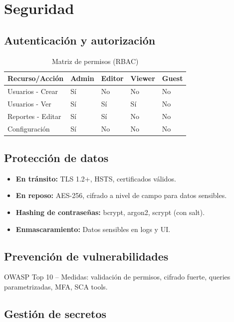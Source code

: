 \documentclass[a4paper,11pt,spanish]{article}
\begin{document}
\newpage

\section{Seguridad}

\subsection{Autenticación y autorización}

\begin{table}[H]
\centering
\caption{Matriz de permisos (RBAC)}
\label{tab:rbac}
\begin{tabular}{@{}lllll@{}}
\toprule
\textbf{Recurso/Acción} & \textbf{Admin} & \textbf{Editor} & \textbf{Viewer} & \textbf{Guest} \\
\midrule
Usuarios - Crear & Sí & No & No & No \\
Usuarios - Ver & Sí & Sí & Sí & No \\
Reportes - Editar & Sí & Sí & No & No \\
Configuración & Sí & No & No & No \\
\bottomrule
\end{tabular}
\end{table}

\subsection{Protección de datos}

\begin{itemize}
    \item \textbf{En tránsito:} TLS 1.2+, HSTS, certificados válidos.
    \item \textbf{En reposo:} AES-256, cifrado a nivel de campo para datos sensibles.
    \item \textbf{Hashing de contraseñas:} bcrypt, argon2, scrypt (con salt).
    \item \textbf{Enmascaramiento:} Datos sensibles en logs y UI.
\end{itemize}

\subsection{Prevención de vulnerabilidades}

OWASP Top 10 -- Medidas: validación de permisos, cifrado fuerte, queries parametrizadas, MFA, SCA tools.

\subsection{Gestión de secretos}
\end{document}
